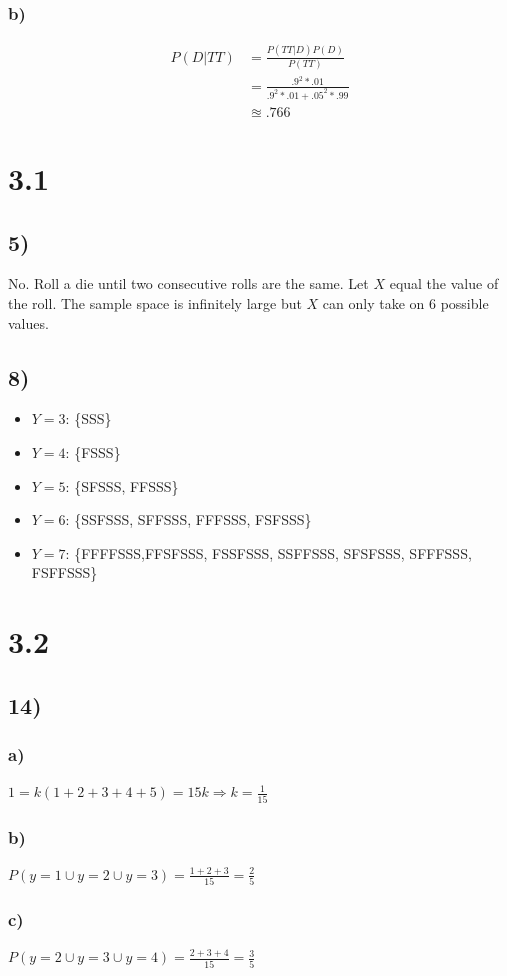 \documentclass{article}
\begin{document}
		\subsubsection*{b)}
			\begin{align*}
				P(D|TT) &= \frac{P(TT|D)P(D)}{P(TT)} \\
				&= \frac{.9^2*.01}{.9^2*.01 + .05^2*.99} \\	
				& \approxeq .766
			\end{align*}
\section*{3.1}
	\subsection*{5)}
		No. Roll a die until two consecutive rolls are the same. Let $X$ equal the value of the roll. The sample space is infinitely large but $X$ can only take on 6 possible values. 
	\subsection*{8)}
		\begin{itemize}
			\item $Y=3$: \{SSS\}
			\item $Y=4$: \{FSSS\}
			\item $Y=5$: \{SFSSS, FFSSS\}
			\item $Y=6$: \{SSFSSS, SFFSSS, FFFSSS, FSFSSS\}
			\item $Y=7$: \{FFFFSSS,FFSFSSS, FSSFSSS, SSFFSSS, SFSFSSS, SFFFSSS, FSFFSSS\}
		\end{itemize}
\section*{3.2}
	\subsection*{14)}
		\subsubsection*{a)}				
			$ 1= k(1+2+3+4+5) = 15k \Rightarrow k = \frac{1}{15}$
		\subsubsection*{b)}
			$P(y=1 \cup y=2 \cup y=3) = \frac{1+2+3}{15} = \frac{2}{5}$
		\subsubsection*{c)}
			$P(y=2 \cup y=3 \cup y=4) = \frac{2+3+4}{15} = \frac{3}{5}$
\end{document}
